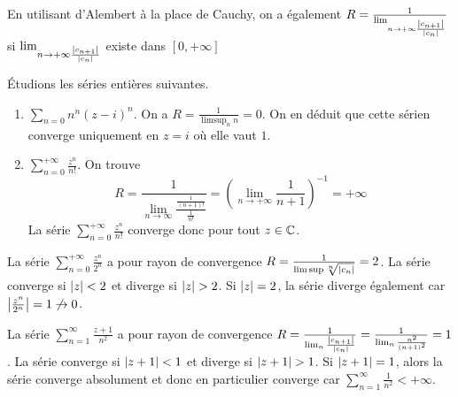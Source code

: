 \begin{remarque}
    En utilisant d'Alembert à la place de Cauchy, on a également $R = \frac{1}{\lim_{n\to + \infty\frac{\left| c_{n+1} \right|}{\left| c_n \right|}}}$ si $\lim_{n\to + \infty\frac{\left| c_{n+1} \right|}{\left| c_n \right|}}$ existe dans $[0,+\infty]$
\end{remarque}
\begin{exemple}Étudions les séries entières suivantes.
    \begin{enumerate}
        \item $\sum_{n=0}n^n(z-i)^n$. On a $R = \frac{1}{\limsup_n n} = 0$. On en déduit que cette sérien converge uniquement en $z=i$ où elle vaut $1$.
        \item $\sum_{n = 0}^{+\infty}\frac{z^n}{n!}$. On trouve $$R = \frac{1}{\lim_{n\to\infty}\frac{\frac{1}{(n+1)!}}{\frac{1}{n!}}} = \left(\lim_{n\to+\infty}\frac{1}{n+1}\right)^{-1} = +\infty$$
        La série $\sum_{n = 0}^{+\infty}\frac{z^n}{n!}$ converge donc pour tout $z\in\mathbb{C}$.
    \end{enumerate}
\end{exemple}
\begin{exemple}
    La série $\sum_{n = 0}^{+\infty}\frac{z^n}{2^n}$ a pour rayon de convergence $R = \frac{1}{\limsup\sqrt[n]{\left| c_n \right|}}=2$. La série converge si $\left| z \right|<2$ et diverge si $\abs{z}> 2$. Si $\left| z \right|=  2$, la série diverge également car $\left| \frac {z^n}{2^n} \right|=1\not\to 0$.
\end{exemple}
\begin{exemple}
    La série $\sum_{n = 1}^\infty \frac{z+1}{n^2}$ a pour rayon de convergence $R = \frac{1}{\lim_n\frac{\left| c_{n+1} \right|}{\left| c_n \right|}} = \frac{1}{\lim_n\frac{n^2}{(n+1)^2}} = 1$. La série converge si $\left| z+1 \right|<1$ et diverge si $\abs{z+1}>1$. Si $\left| z+1 \right| = 1$, alors la série converge absolument et donc en particulier converge car $\sum_{n=1}^\infty\frac1{n^2}<+\infty$.
\end{exemple}
